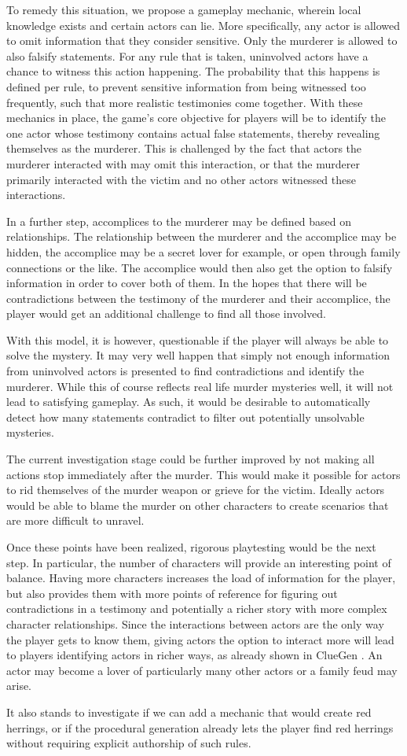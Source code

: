 To remedy this situation, we propose a gameplay mechanic, wherein local knowledge exists and certain actors can lie.
More specifically, any actor is allowed to omit information that they consider sensitive.
Only the murderer is allowed to also falsify statements.
For any rule that is taken, uninvolved actors have a chance to witness this action happening.
The probability that this happens is defined per rule, to prevent sensitive information from being witnessed too frequently, such that more realistic testimonies come together.
With these mechanics in place, the game's core objective for players will be to identify the one actor whose testimony contains actual false statements, thereby revealing themselves as the murderer.
This is challenged by the fact that actors the murderer interacted with may omit this interaction, or that the murderer primarily interacted with the victim and no other actors witnessed these interactions.

In a further step, accomplices to the murderer may be defined based on relationships.
The relationship between the murderer and the accomplice may be hidden, the accomplice may be a secret lover for example, or open through family connections or the like.
The accomplice would then also get the option to falsify information in order to cover both of them.
In the hopes that there will be contradictions between the testimony of the murderer and their accomplice, the player would get an additional challenge to find all those involved.

With this model, it is however, questionable if the player will always be able to solve the mystery.
It may very well happen that simply not enough information from uninvolved actors is presented to find contradictions and identify the murderer.
While this of course reflects real life murder mysteries well, it will not lead to satisfying gameplay.
As such, it would be desirable to automatically detect how many statements contradict to filter out potentially unsolvable mysteries.

The current investigation stage could be further improved by not making all actions stop immediately after the murder.
This would make it possible for actors to rid themselves of the murder weapon or grieve for the victim.
Ideally actors would be able to blame the murder on other characters to create scenarios that are more difficult to unravel.

Once these points have been realized, rigorous playtesting would be the next step.
In particular, the number of characters will provide an interesting point of balance.
Having more characters increases the load of information for the player, but also provides them with more points of reference for figuring out contradictions in a testimony and potentially a richer story with more complex character relationships.
Since the interactions between actors are the only way the player gets to know them, giving actors the option to interact more will lead to players identifying actors in richer ways, as already shown in ClueGen .
An actor may become a lover of particularly many other actors or a family feud may arise.

It also stands to investigate if we can add a mechanic that would create red herrings, or if the procedural generation already lets the player find red herrings without requiring explicit authorship of such rules.
